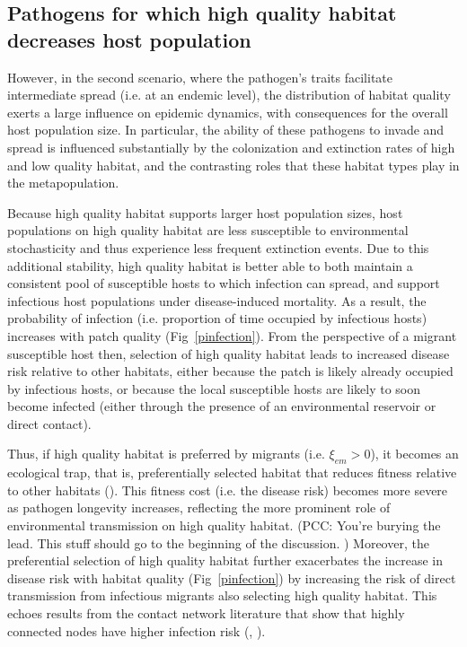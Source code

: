 \documentclass{article}
\begin{document}
\subsection*{Pathogens for which high quality habitat decreases host population}

However, in the second scenario, where the pathogen's traits facilitate intermediate spread (i.e. at an endemic level), the distribution of habitat quality exerts a large influence on epidemic dynamics, with consequences for the overall host population size.
In particular, the ability of these pathogens to invade and spread is influenced substantially by the colonization and extinction rates of high and low quality habitat, and the contrasting roles that these habitat types play in the metapopulation.
 
Because high quality habitat supports larger host population sizes, host populations on high quality habitat are less susceptible to environmental stochasticity and thus experience less frequent extinction events.
Due to this additional stability, high quality habitat is better able to both maintain a consistent pool of susceptible hosts to which infection can spread, and support infectious host populations under disease-induced mortality. 
As a result, the probability of infection (i.e. proportion of time occupied by infectious hosts) increases with patch quality (Fig~\ref{pinfection}).
From the perspective of a migrant susceptible host then, selection of high quality habitat leads to increased disease risk relative to other habitats, either because the patch is likely already occupied by infectious hosts, or because the local susceptible hosts are likely to soon become infected (either through the presence of an environmental reservoir or direct contact).

Thus, if high quality habitat is preferred by migrants (i.e. $\xi_{em} > 0$), it becomes an ecological trap, that is, preferentially selected habitat that reduces fitness relative to other habitats (\cite{Robertson2006}).
This fitness cost (i.e. the disease risk) becomes more severe as pathogen longevity increases, reflecting the more prominent role of environmental transmission on high quality habitat. (PCC: You're burying the lead. This stuff should go to the beginning of the discussion. )
Moreover, the preferential selection of high quality habitat further exacerbates the increase in disease risk with habitat quality (Fig~\ref{pinfection}) by increasing the risk of direct transmission from infectious migrants also selecting high quality habitat.
This echoes results from the contact network literature that show that highly connected nodes have higher infection risk (\cite{Christley2005}, \cite{Keeling2005}).
\end{document}
